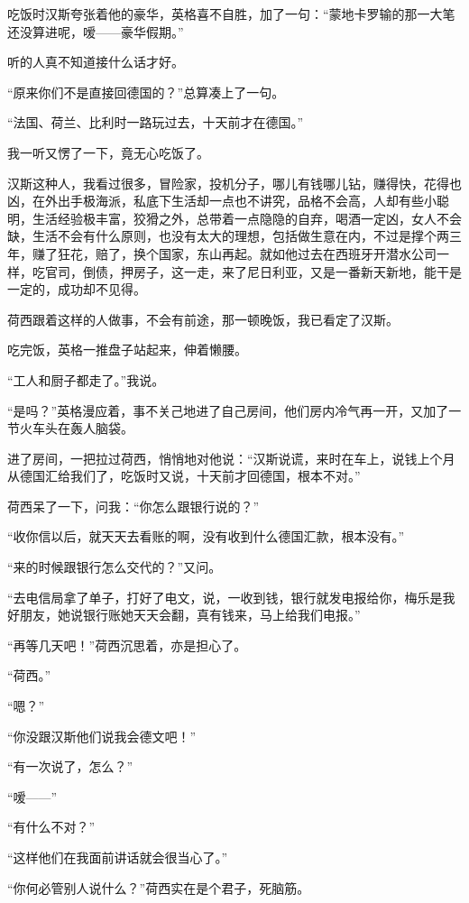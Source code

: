 \par 吃饭时汉斯夸张着他的豪华，英格喜不自胜，加了一句：“蒙地卡罗输的那一大笔还没算进呢，嗳——豪华假期。”
\par 听的人真不知道接什么话才好。
\par “原来你们不是直接回德国的？”总算凑上了一句。
\par “法国、荷兰、比利时一路玩过去，十天前才在德国。”
\par 我一听又愣了一下，竟无心吃饭了。
\par 汉斯这种人，我看过很多，冒险家，投机分子，哪儿有钱哪儿钻，赚得快，花得也凶，在外出手极海派，私底下生活却一点也不讲究，品格不会高，人却有些小聪明，生活经验极丰富，狡猾之外，总带着一点隐隐的自弃，喝酒一定凶，女人不会缺，生活不会有什么原则，也没有太大的理想，包括做生意在内，不过是撑个两三年，赚了狂花，赔了，换个国家，东山再起。就如他过去在西班牙开潜水公司一样，吃官司，倒债，押房子，这一走，来了尼日利亚，又是一番新天新地，能干是一定的，成功却不见得。
\par 荷西跟着这样的人做事，不会有前途，那一顿晚饭，我已看定了汉斯。
\par 吃完饭，英格一推盘子站起来，伸着懒腰。
\par “工人和厨子都走了。”我说。
\par “是吗？”英格漫应着，事不关己地进了自己房间，他们房内冷气再一开，又加了一节火车头在轰人脑袋。
\par 进了房间，一把拉过荷西，悄悄地对他说：“汉斯说谎，来时在车上，说钱上个月从德国汇给我们了，吃饭时又说，十天前才回德国，根本不对。”
\par 荷西呆了一下，问我：“你怎么跟银行说的？”
\par “收你信以后，就天天去看账的啊，没有收到什么德国汇款，根本没有。”
\par “来的时候跟银行怎么交代的？”又问。
\par “去电信局拿了单子，打好了电文，说，一收到钱，银行就发电报给你，梅乐是我好朋友，她说银行账她天天会翻，真有钱来，马上给我们电报。”
\par “再等几天吧！”荷西沉思着，亦是担心了。
\par “荷西。”
\par “嗯？”
\par “你没跟汉斯他们说我会德文吧！”
\par “有一次说了，怎么？”
\par “嗳——”
\par “有什么不对？”
\par “这样他们在我面前讲话就会很当心了。”
\par “你何必管别人说什么？”荷西实在是个君子，死脑筋。
